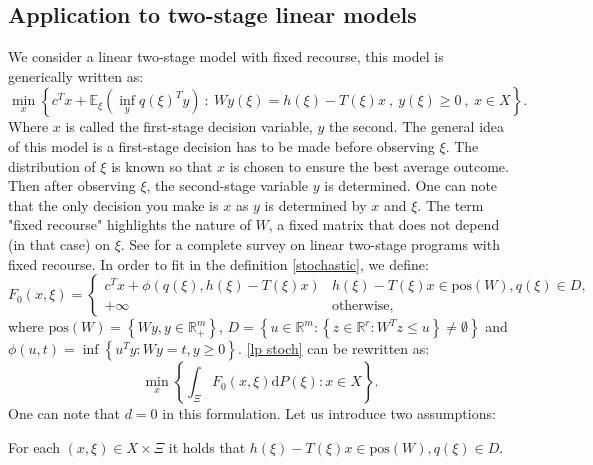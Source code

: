 \documentclass{amsart}
\newcommand{\RR}{\mathbb{R}}
\begin{document}
\subsection{Application to two-stage linear models}\label{two stage}
We consider a linear two-stage model with fixed recourse, this model is generically written as: 
\begin{equation}\label{lp stoch}
    \min_x\left\{c^Tx + \mathbb{E}_\xi\left(\inf_y q\left(\xi\right)^Ty \right)\: :\: Wy\left(\xi\right)=h\left(\xi\right)-T\left(\xi\right)x\:,\: y\left(\xi\right)\geq0\:,\: x\in X \right\}.
\end{equation}
Where $x$ is called the first-stage decision variable, $y$ the second. The general idea of this model is a first-stage decision has to be made before observing $\xi$. The distribution of $\xi$ is known so that $x$ is chosen to ensure the best average outcome. Then after observing $\xi$, the second-stage variable $y$ is determined. One can note that the only decision you make is $x$ as $y$ is determined by $x$ and $\xi$. The term "fixed recourse" highlights the nature of $W$, a fixed matrix that does not depend (in that case) on $\xi$. See \cite{wets_stochastic_1974} for a complete survey on linear two-stage programs with fixed recourse. In order to fit in the definition  \ref{stochastic}, we define:
$$
F_0\left(x,\xi\right)=\begin{cases} 
  c^Tx + \phi\left(q\left(\xi\right), h\left(\xi\right) -T\left(\xi\right)x\right) & h\left(\xi\right)-     T\left(\xi\right)x \in \text{pos}\left(W\right), q\left(\xi\right) \in D, \\
  +\infty & \text{otherwise},
\end{cases}
$$
where $\text{pos}(W)=\left\{Wy, y\in\RR_+^m\right\}$, $D=\left\{u\in\RR^m:\left\{z\in\RR^r:W^Tz \leq u\right\}\ne \emptyset\right\}$ and  \\$\phi\left(u,t\right)=\inf\left\{ u^Ty : Wy=t, y\geq0\right\}$. \ref{lp stoch} can be rewritten as:
\begin{equation}\label{rewrite}
    \min_x\left\{\int_\Xi F_0\left(x,\xi\right)\text{d}P\left(\xi\right): x\in X\right\}. 
\end{equation}
One can note that $d=0$ in this formulation. Let us introduce two assumptions: 
\begin{assumption}\label{h1} For each $\left(x,\xi\right)\in X\times \Xi$ it holds that $h\left(\xi\right)- T\left(\xi\right)x\in \text{pos}\left(W\right), q\left(\xi\right) \in D$.
\end{assumption}
\end{document}
